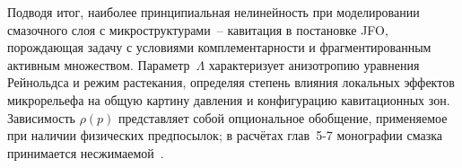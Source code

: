 Подводя итог, наиболее принципиальная нелинейность при
моделировании смазочного слоя с микроструктурами~-- кавитация
в постановке JFO, порождающая задачу с условиями
комплементарности и фрагментированным активным множеством.
Параметр~$\Lambda$ характеризует анизотропию уравнения
Рейнольдса и режим растекания, определяя степень влияния
локальных эффектов микрорельефа на общую картину давления
и конфигурацию кавитационных зон. Зависимость $\rho(p)$
представляет собой опциональное обобщение, применяемое при
наличии физических предпосылок; в расчётах глав~5-7
монографии смазка принимается несжимаемой~\cite{jang2002,rebufa2017}.
